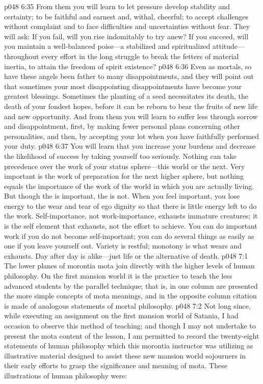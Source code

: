 \vs p048 6:35 From them you will learn to let pressure develop stability and certainty; to be faithful and earnest and, withal, cheerful; to accept challenges without complaint and to face difficulties and uncertainties without fear. They will ask: If you fail, will you rise indomitably to try anew? If you succeed, will you maintain a well\hyp{}balanced poise---a stabilized and spiritualized attitude---throughout every effort in the long struggle to break the fetters of material inertia, to attain the freedom of spirit existence?
\vs p048 6:36 Even as mortals, so have these angels been father to many disappointments, and they will point out that sometimes your most disappointing disappointments have become your greatest blessings. Sometimes the planting of a seed necessitates its death, the death of your fondest hopes, before it can be reborn to bear the fruits of new life and new opportunity. And from them you will learn to suffer less through sorrow and disappointment, first, by making fewer personal plans concerning other personalities, and then, by accepting your lot when you have faithfully performed your duty.
\vs p048 6:37 You will learn that you increase your burdens and decrease the likelihood of success by taking yourself too seriously. Nothing can take precedence over the work of your status sphere---this world or the next. Very important is the work of preparation for the next higher sphere, but nothing equals the importance of the work of the world in which you are actually living. But though the  is important, the  is not. When you feel important, you lose energy to the wear and tear of ego dignity so that there is little energy left to do the work. Self\hyp{}importance, not work\hyp{}importance, exhausts immature creatures; it is the self element that exhausts, not the effort to achieve. You can do important work if you do not become self\hyp{}important; you can do several things as easily as one if you leave yourself out. Variety is restful; monotony is what wears and exhausts. Day after day is alike---just life or the alternative of death.\plusone
{}
\vs p048 7:1 The lower planes of morontia mota join directly with the higher levels of human philosophy. On the first mansion world it is the practice to teach the less advanced students by the parallel technique; that is, in one column are presented the more simple concepts of mota meanings, and in the opposite column citation is made of analogous statements of mortal philosophy.
\vs p048 7:2 Not long since, while executing an assignment on the first mansion world of Satania, I had occasion to observe this method of teaching; and though I may not undertake to present the mota content of the lesson, I am permitted to record the twenty\hyp{}eight statements of human philosophy which this morontia instructor was utilizing as illustrative material designed to assist these new mansion world sojourners in their early efforts to grasp the significance and meaning of mota. These illustrations of human philosophy were:
